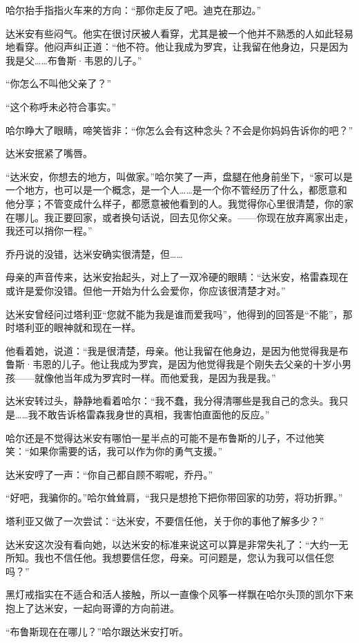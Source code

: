\documentclass[../main]{subfiles}
\begin{document}
哈尔抬手指指火车来的方向：“那你走反了吧。迪克在那边。”

达米安有些闷气。他实在很讨厌被人看穿，尤其是被一个他并不熟悉的人如此轻易地看穿。他闷声纠正道：“他不符。他让我成为罗宾，让我留在他身边，只是因为我是父……布鲁斯·韦恩的儿子。”

“你怎么不叫他父亲了？”

“这个称呼未必符合事实。”

哈尔睁大了眼睛，啼笑皆非：“你怎么会有这种念头？不会是你妈妈告诉你的吧？”

达米安抿紧了嘴唇。

“达米安，你想去的地方，叫做家。”哈尔笑了一声，盘腿在他身前坐下，“家可以是一个地方，也可以是一个概念，是一个人……是一个你不管经历了什么，都愿意和他分享；不管变成什么样子，都愿意被他看到的人。我觉得你心里很清楚，你的家在哪儿。我正要回家，或者换句话说，回去见你父亲。——你现在放弃离家出走，我还可以捎你一程。”

乔丹说的没错，达米安确实很清楚，但……

母亲的声音传来，达米安抬起头，对上了一双冷硬的眼睛：“达米安，格雷森现在或许是爱你没错。但他一开始为什么会爱你，你应该很清楚才对。”

达米安曾经问过塔利亚“您就不能为我是谁而爱我吗”，他得到的回答是“不能”，那时塔利亚的眼神就和现在一样。

他看着她，说道：“我是很清楚，母亲。他让我留在他身边，是因为他觉得我是布鲁斯·韦恩的儿子。他让我成为罗宾，是因为他觉得我是个刚失去父亲的十岁小男孩——就像他当年成为罗宾时一样。而他爱我，是因为我是我。”

达米安转过头，静静地看着哈尔：“我不蠢，我分得清哪些是我自己的念头。我只是……我不敢告诉格雷森我身世的真相，我害怕直面他的反应。”

哈尔还是不觉得达米安有哪怕一星半点的可能不是布鲁斯的儿子，不过他笑笑：“如果你需要的话，我可以作为你的勇气支援。”

达米安哼了一声：“你自己都自顾不暇呢，乔丹。”

“好吧，我骗你的。”哈尔耸耸肩，“我只是想抢下把你带回家的功劳，将功折罪。”

塔利亚又做了一次尝试：“达米安，不要信任他，关于你的事他了解多少？”

达米安这次没有看向她，以达米安的标准来说这可以算是非常失礼了：“大约一无所知。我也不信任他。我想要信任您，母亲。可问题是，您认为我可以信任您吗？”

黑灯戒指实在不适合和活人接触，所以一直像个风筝一样飘在哈尔头顶的凯尔下来抱上了达米安，一起向哥谭的方向前进。

“布鲁斯现在在哪儿？”哈尔跟达米安打听。
\end{document}
